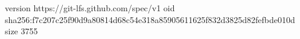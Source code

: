 version https://git-lfs.github.com/spec/v1
oid sha256:f7c207c25f90d9a80814d68c54e318a85905611625f832d3825d82fefbde010d
size 3755
